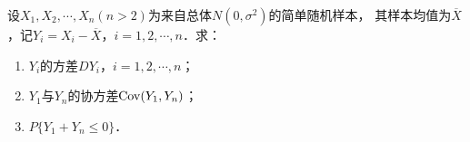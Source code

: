 \documentclass[plain,noanswer,medmath]{../../template/jnuexam}
\begin{document}


\begin{problem}[points=13]
设$X_1,X_2, \cdots ,X_n(n > 2)$为来自总体$N(0,\sigma^2)$的简单随机样本，
其样本均值为$\overline{X}$，记$Y_i = X_i - \overline{X}$，$i = 1,2, \cdots ,n$．求：
\begin{enumerate}
\item $Y_i$的方差$DY_i$，$i = 1,2, \cdots ,n$；
\item $Y_1$与$Y_n$的协方差$\operatorname{Cov} (Y_1,Y_n)$；
\item $P\{Y_1 + Y_n \le 0\}$．
\end{enumerate}
\end{problem}
\end{document}
